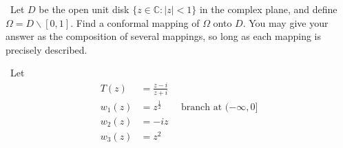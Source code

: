 \documentclass[12pt]{Homework}
\begin{document}
\begin{problem} $\,$
Let $D$ be the open unit disk $\{z\in\mathbb{C}:|z|<1\}$ in the complex plane, and define $\Omega=D\backslash[0,1].$ Find a conformal mapping of $\Omega$ onto $D.$ You may give your answer as the composition of several mappings, so long as each mapping is precisely described.
\end{problem}


\begin{solution}$\,$
Let \begin{align*}
    T(z)&=\frac{z-i}{z+i}\\
    w_1(z)&=z^{\frac{1}{2}}\qquad\text{branch at }(-\infty,0]\\
    w_2(z)&=-iz\\
    w_3(z)&=z^2
\end{align*}


\end{solution}
\end{document}
